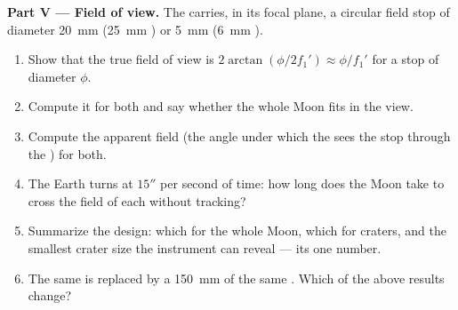 \begin{problem}
\medskip
\noindent\textbf{Part V --- Field of view.}
The  carries, in its focal plane, a circular field stop of
diameter \qty{20}{mm} (\qty{25}{mm} ) or \qty{5}{mm}
(\qty{6}{mm} ).
\begin{enumerate}[resume]
  \item Show that the true field of view is $2\arctan(\phi/2f_1')
        \approx \phi/f_1'$ for a stop of diameter $\phi$.
  \item Compute it for both  and say whether the whole Moon
        fits in the view.
  \item Compute the apparent field (the angle under which the  sees
        the stop through the ) for both.
  \item The Earth turns at $15''$ per second of time: how long does the
        Moon take to cross the field of each  without tracking?
  \item Summarize the design: which  for the whole Moon, which
        for craters, and the smallest crater size the instrument can
        reveal --- its one number.
  \item The same  is replaced by a \qty{150}{mm} 
        of the same . Which of the above results change?
\end{enumerate}
\end{problem}
